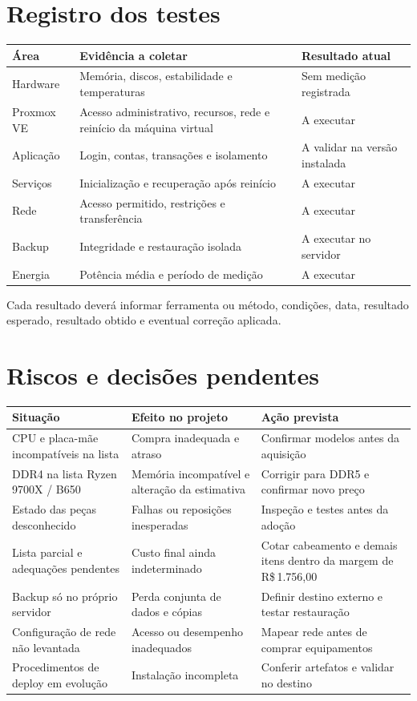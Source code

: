 \documentclass[11pt,a4paper,oneside]{report}
\newcommand{\dinheiro}[1]{R\$\,#1}
\begin{document}
\section{Registro dos testes}
\begin{tabularx}{\textwidth}{@{}p{3.5cm}YY@{}}
\toprule
Área & Evidência a coletar & Resultado atual \\
\midrule
Hardware & Memória, discos, estabilidade e temperaturas & Sem medição registrada \\
Proxmox VE & Acesso administrativo, recursos, rede e reinício da máquina virtual & A executar \\
Aplicação & Login, contas, transações e isolamento & A validar na versão instalada \\
Serviços & Inicialização e recuperação após reinício & A executar \\
Rede & Acesso permitido, restrições e transferência & A executar \\
Backup & Integridade e restauração isolada & A executar no servidor \\
Energia & Potência média e período de medição & A executar \\
\bottomrule
\end{tabularx}
Cada resultado deverá informar ferramenta ou método, condições, data,
resultado esperado, resultado obtido e eventual correção aplicada.

\section{Riscos e decisões pendentes}
\begin{tabularx}{\textwidth}{@{}p{4cm}YY@{}}
\toprule
Situação & Efeito no projeto & Ação prevista \\
\midrule
CPU e placa-mãe incompatíveis na lista & Compra inadequada e atraso & Confirmar modelos antes da aquisição \\
DDR4 na lista Ryzen 9700X / B650 & Memória incompatível e alteração da estimativa & Corrigir para DDR5 e confirmar novo preço \\
Estado das peças desconhecido & Falhas ou reposições inesperadas & Inspeção e testes antes da adoção \\
Lista parcial e adequações pendentes & Custo final ainda indeterminado & Cotar cabeamento e demais itens dentro da margem de \dinheiro{1.756,00} \\
Backup só no próprio servidor & Perda conjunta de dados e cópias & Definir destino externo e testar restauração \\
Configuração de rede não levantada & Acesso ou desempenho inadequados & Mapear rede antes de comprar equipamentos \\
Procedimentos de deploy em evolução & Instalação incompleta & Conferir artefatos e validar no destino \\
\bottomrule
\end{tabularx}
\end{document}
